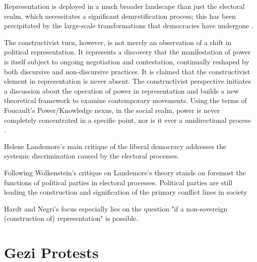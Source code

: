 \documentclass[nobib]{tufte-book}
\theoremstyle{mytheoremstyle}
\theoremstyle{mytheoremstyle}
\theoremstyle{myproblemstyle}
\begin{document}
Representation is deployed in a much broader landscape than just the electoral realm, which necessitates a significant demystification process; this has been precipitated by the large-scale transformations that democracies have undergone \parencite[278f]{wolkenstein2024}.


The constructivist turn, however, is not merely an observation of a shift in political representation. It represents a discovery that the manifestation of power is itself subject to ongoing negotiation and contestation, continually reshaped by both discursive and non-discursive practices. It is claimed that the constructivist element in representation is never absent. The constructivist perspective initiates a discussion about the operation of power in representation and builds a new theoretical framework to examine contemporary movements. Using the terms of Foucault's Power/Knowledge nexus, in the social realm, power is never completely concentrated in a specific point, nor is it ever a unidirectional process \parencite{Foucault1980}. 


Helene Landemore's \parencite{landemore2020} main critique of the liberal
democracy addresses the systemic discrimination caused by the electoral
processes.

Following Wolkenstein's \parencite{wolkenstein2024} critique on Landemore's theory stands on foremost the functions of political parties in electoral processes. Political parties are still leading the construction and signification of the primary conflict lines in society

Hardt and Negri's \parencite{hardt2017} focus especially lies on the question
"if a non-sovereign (construction of) representation" is possible. 

\section{Gezi Protests}
\end{document}
